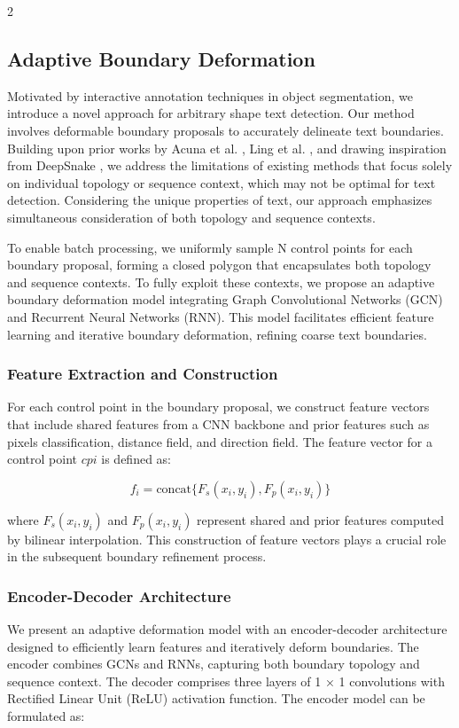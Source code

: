 \documentclass[sn-mathphys,Numbered]{sn-jnl}%
\begin{document}
\begin{multicols}{2}
\subsection{Adaptive Boundary Deformation}

Motivated by interactive annotation techniques in object segmentation, we introduce a novel approach for arbitrary shape text detection. Our method involves deformable boundary proposals to accurately delineate text boundaries. Building upon prior works by Acuna et al. \cite{acuna2018efficient}, Ling et al. \cite{ling2019fast}, and drawing inspiration from DeepSnake \cite{peng2020deep}, we address the limitations of existing methods that focus solely on individual topology or sequence context, which may not be optimal for text detection. Considering the unique properties of text, our approach emphasizes simultaneous consideration of both topology and sequence contexts.

To enable batch processing, we uniformly sample N control points for each boundary proposal, forming a closed polygon that encapsulates both topology and sequence contexts. To fully exploit these contexts, we propose an adaptive boundary deformation model integrating Graph Convolutional Networks (GCN) and Recurrent Neural Networks (RNN). This model facilitates efficient feature learning and iterative boundary deformation, refining coarse text boundaries.

\subsubsection{Feature Extraction and Construction}

For each control point in the boundary proposal, we construct feature vectors that include shared features from a CNN backbone and prior features such as pixels classification, distance field, and direction field. The feature vector for a control point $cpi$ is defined as:

\begin{equation}
    f_i = \text{concat}\{F_s(x_i, y_i), F_p(x_i, y_i)\}
\end{equation}

where $F_s(x_i, y_i)$ and $F_p(x_i, y_i)$ represent shared and prior features computed by bilinear interpolation. This construction of feature vectors plays a crucial role in the subsequent boundary refinement process.

\subsubsection{Encoder-Decoder Architecture}
We present an adaptive deformation model with an encoder-decoder architecture designed to efficiently learn features and iteratively deform boundaries. The encoder combines GCNs and RNNs, capturing both boundary topology and sequence context. The decoder comprises three layers of 1 × 1 convolutions with Rectified Linear Unit (ReLU) activation function. The encoder model can be formulated as:


\end{multicols}
\end{document}
